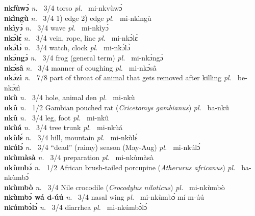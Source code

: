 {\bfseries nkfùwɔ́}  {\itshape n.~} 3/4 torso  {\itshape pl.~} mi-nkvùwɔ́    \\ 
{\bfseries nkìngù}  {\itshape n.~} 3/4 1) edge 2) edge {\itshape pl.~} mi-nkìngù    \\ 
{\bfseries nkìyɔ́}  {\itshape n.~} 3/4 wave {\itshape pl.~} mi-nkìyɔ́    \\ 
{\bfseries nkɔ̀lɛ́}  {\itshape n.~} 3/4 vein, rope, line {\itshape pl.~} mi-nkɔ̀lɛ́    \\ 
{\bfseries nkɔ́lɔ̀}  {\itshape n.~} 3/4 watch, clock {\itshape pl.~} mi-nkɔ́lɔ̀    \\ 
{\bfseries nkɔ́ngɔ́}  {\itshape n.~} 3/4 frog (general term) {\itshape pl.~} mi-nkɔ́ngɔ́    \\ 
{\bfseries nkɔ́sâ}  {\itshape n.~} 3/4 manner of coughing {\itshape pl.~} mi-nkɔ́sâ    \\ 
{\bfseries nkɔ́zì}  {\itshape n.~} 7/8 part of throat of animal that gets removed after killing {\itshape pl.~} be-nkɔ́zì    \\ 
{\bfseries nkù}  {\itshape n.~} 3/4 hole, animal den {\itshape pl.~} mi-nkù    \\ 
{\bfseries nkû}  {\itshape n.~} 1/2 Gambian pouched rat ({\itshape Cricetomys gambianus}) {\itshape pl.~} ba-nkû    \\ 
{\bfseries nkû}  {\itshape n.~} 3/4 leg, foot {\itshape pl.~} mi-nkû    \\ 
{\bfseries nkùá}  {\itshape n.~} 3/4 tree trunk {\itshape pl.~} mi-nkùá    \\ 
{\bfseries nkùlɛ́}  {\itshape n.~} 3/4 hill, mountain {\itshape pl.~} mi-nkùlɛ́    \\ 
{\bfseries nkúlɔ́}  {\itshape n.~} 3/4 ``dead'' (raimy) season (May-Aug) {\itshape pl.~} mi-nkúlɔ́    \\ 
{\bfseries nkùmàsà}  {\itshape n.~} 3/4 preparation {\itshape pl.~} mi-nkùmàsà    \\ 
{\bfseries nkùmbɔ́}  {\itshape n.~} 1/2 African brush-tailed porcupine ({\itshape Atherurus africanus}) {\itshape pl.~} ba-nkùmbɔ́    \\ 
{\bfseries nkùmbò}  {\itshape n.~} 3/4 Nile crocodile ({\itshape Crocodylus niloticus}) {\itshape pl.~} mi-nkùmbò    \\ 
{\bfseries nkùmbɔ́ wá d-úú}  {\itshape n.~} 3/4 nasal wing {\itshape pl.~} mi-nkùmbɔ́ mí m-úú    \\ 
{\bfseries nkúmbɔ̀lɔ́}  {\itshape n.~} 3/4 diarrhea {\itshape pl.~} mi-nkúmbɔ̀lɔ́    \\ 
